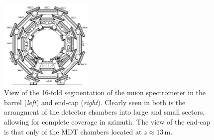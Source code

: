 \begin{figure}[!htb]
    \begin{center}
        \includegraphics[width=0.4\textwidth]{figures/chapter2/muon_spec/atlas_muon_barrel}
        \caption{
            View of the 16-fold segmentation of the muon spectrometer in the barrel (\textit{left})
            and end-cap (\textit{right}).
            Clearly seen in both is the arrangment of the detector chambers into large and
            small sectors, allowing for complete coverage in azimuth.
            The view of the end-cap is that only of the MDT chambers located at $z\approx13$\,m.
        }
        \label{fig:muon_segmentation}
    \end{center}
\end{figure}

